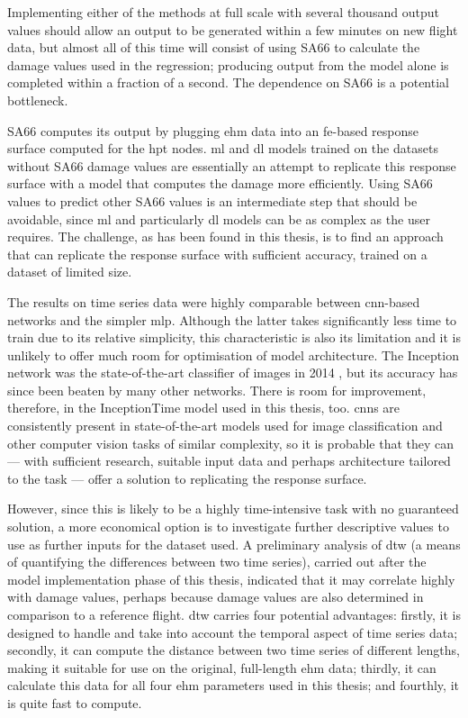 Implementing either of the methods at full scale with several thousand output values should allow an output to be generated within a few minutes on new flight data, but almost all of this time will consist of using SA66 to calculate the damage values used in the regression; producing output from the model alone is completed within a fraction of a second. The dependence on SA66 is a potential bottleneck.

SA66 computes its output by plugging \ac{ehm} data into an \ac{fe}-based response surface computed for the \ac{hpt} nodes. \ac{ml} and \ac{dl} models trained on the datasets without SA66 damage values are essentially an attempt to replicate this response surface with a model that computes the damage more efficiently. Using SA66 values to predict other SA66 values is an intermediate step that should be avoidable, since \ac{ml} and particularly \ac{dl} models can be as complex as the user requires. The challenge, as has been found in this thesis, is to find an approach that can replicate the response surface with sufficient accuracy, trained on a dataset of limited size.

The results on time series data were highly comparable between \ac{cnn}-based networks and the simpler \ac{mlp}. Although the latter takes significantly less time to train due to its relative simplicity, this characteristic is also its limitation and it is unlikely to offer much room for optimisation of model architecture. The Inception network was the state-of-the-art classifier of images in 2014 \cite[]{szegedy_going_2014}, but its accuracy has since been beaten by many other networks. There is room for improvement, therefore, in the InceptionTime model used in this thesis, too. \ac{cnn}s are consistently present in state-of-the-art models used for image classification and other computer vision tasks of similar complexity, so it is probable that they can --- with sufficient research, suitable input data and perhaps architecture tailored to the task --- offer a solution to replicating the response surface.

However, since this is likely to be a highly time-intensive task with no guaranteed solution, a more economical option is to investigate further descriptive values to use as further inputs for the dataset used. A preliminary analysis of \ac{dtw} (a means of quantifying the differences between two time series), carried out after the model implementation phase of this thesis, indicated that it may correlate highly with damage values, perhaps because damage values are also determined in comparison to a reference flight. \ac{dtw} carries four potential advantages: firstly, it is designed to handle and take into account the temporal aspect of time series data; secondly, it can compute the distance between two time series of different lengths, making it suitable for use on the original, full-length \ac{ehm} data; thirdly, it can calculate this data for all four \ac{ehm} parameters used in this thesis; and fourthly, it is quite fast to compute. %

